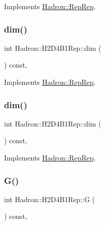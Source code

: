 Implements \mbox{\hyperlink{structHadron_1_1RepRep_a92c8802e5ed7afd7da43ccfd5b7cd92b}{Hadron\+::\+Rep\+Rep}}.

\mbox{\label{structHadron_1_1H2D4B1Rep_af795d001f668da987faaaf60a84878bb}} 
\subsubsection{\texorpdfstring{dim()}{dim()}\hspace{0.1cm}{\footnotesize\ttfamily [2/3]}}
{\footnotesize\ttfamily int Hadron\+::\+H2\+D4\+B1\+Rep\+::dim (\begin{DoxyParamCaption}{ }\end{DoxyParamCaption}) const\hspace{0.3cm}{\ttfamily [inline]}, {\ttfamily [virtual]}}



Implements \mbox{\hyperlink{structHadron_1_1RepRep_a92c8802e5ed7afd7da43ccfd5b7cd92b}{Hadron\+::\+Rep\+Rep}}.

\mbox{\label{structHadron_1_1H2D4B1Rep_af795d001f668da987faaaf60a84878bb}} 
\subsubsection{\texorpdfstring{dim()}{dim()}\hspace{0.1cm}{\footnotesize\ttfamily [3/3]}}
{\footnotesize\ttfamily int Hadron\+::\+H2\+D4\+B1\+Rep\+::dim (\begin{DoxyParamCaption}{ }\end{DoxyParamCaption}) const\hspace{0.3cm}{\ttfamily [inline]}, {\ttfamily [virtual]}}



Implements \mbox{\hyperlink{structHadron_1_1RepRep_a92c8802e5ed7afd7da43ccfd5b7cd92b}{Hadron\+::\+Rep\+Rep}}.

\mbox{\label{structHadron_1_1H2D4B1Rep_a327c671d4dca8693f717827d478e03aa}} 
\subsubsection{\texorpdfstring{G()}{G()}\hspace{0.1cm}{\footnotesize\ttfamily [1/2]}}
{\footnotesize\ttfamily int Hadron\+::\+H2\+D4\+B1\+Rep\+::G (\begin{DoxyParamCaption}{ }\end{DoxyParamCaption}) const\hspace{0.3cm}{\ttfamily [inline]}, {\ttfamily [virtual]}}

